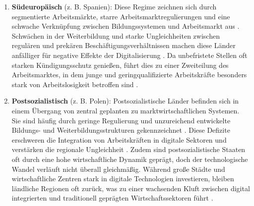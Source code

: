\begin{enumerate}

    \item \textbf{Südeuropäisch} (z. B. Spanien): Diese Regime zeichnen sich durch 
    segmentierte Arbeitsmärkte, starre Arbeitsmarktregulierungen und eine schwache 
    Verknüpfung zwischen Bildungssystemen und Arbeitsmarkt aus 
    \parencite[S. 19]{ferrera1996thesouthern}. Schwächen in der Weiterbildung 
    und starke Ungleichheiten zwischen regulären und prekären Beschäftigungsverhältnissen 
    machen diese Länder anfälliger für negative Effekte der Digitalisierung 
    \parencite[S. 19-20]{ferrera1996thesouthern}. Da unbefristete Stellen oft starken 
    Kündigungsschutz genießen, führt dies zu einer Zweiteilung des Arbeitsmarktes, in dem 
    junge und geringqualifizierte Arbeitskräfte besonders stark von Arbeitslosigkeit 
    betroffen sind \parencite[S. 19-21]{ferrera1996thesouthern}.
    
    \item \textbf{Postsozialistisch} (z. B. Polen): Postsozialistische Länder befinden sich 
    in einem Übergang von zentral geplanten zu marktwirtschaftlichen Systemen. Sie sind 
    häufig durch geringe Regulierung und unzureichend entwickelte Bildungs- und 
    Weiterbildungsstrukturen gekennzeichnet \parencite[S. 88–93]{cerami2006socialpolicy}. 
    Diese Defizite erschweren die Integration von Arbeitskräften in digitale Sektoren und 
    verstärken die regionale Ungleichheit \parencite[S. 88–93]{cerami2006socialpolicy}. 
    Zudem sind postsozialistische Staaten oft durch eine hohe wirtschaftliche Dynamik 
    geprägt, doch der technologische Wandel verläuft nicht überall gleichmäßig. Während 
    große Städte und wirtschaftliche Zentren stark in digitale Technologien investieren, 
    bleiben ländliche Regionen oft zurück, was zu einer wachsenden Kluft zwischen digital 
    integrierten und traditionell geprägten Wirtschaftssektoren führt 
    \parencite[S. 90]{cerami2006socialpolicy}.
    
\end{enumerate}

